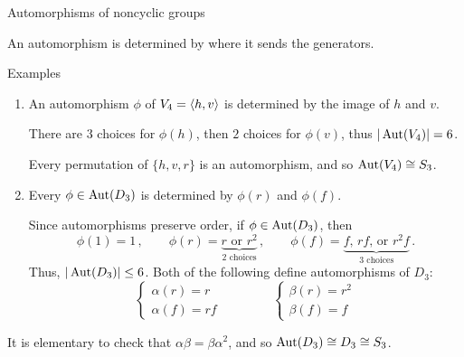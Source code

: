 \documentclass[8pt, handout]{beamer}
\newcommand{\Pause}{}      %
\begin{document}
\begin{frame}{Automorphisms of noncyclic groups}
    
  An automorphism is determined by where it sends the generators.
  
  \begin{exampleblock}{Examples} 
    \begin{enumerate}
    \item An automorphism $\phi$ of $V_4=\langle h,v\rangle$ is determined by the
      image of $h$ and $v$. \medskip\Pause
      
      There are $3$ choices for $\phi(h)$, then $2$ choices for
      $\phi(v)$, thus $|\operatorname{Aut}(V_4)|=6$. \medskip\Pause
      
      Every permutation of $\{h,v,r\}$ is an automorphism, and so
      $\operatorname{Aut}(V_4)\cong S_3$. \medskip\pause
      
    \item Every $\phi\in\operatorname{Aut}(D_3)$ is determined by $\phi(r)$ and
      $\phi(f)$. \medskip\Pause
      
      Since automorphisms preserve order, if $\phi\in\operatorname{Aut}(D_3)$, then 
      \[
      \phi(1)=1\,,\qquad \phi(r)=\underbrace{\text{$r$ or $r^2$}}_{\text{2
          choices}}\,,\qquad \phi(f)=\underbrace{\text{$f$, $rf$, or
          $r^2f$}}_{\text{3 choices}}\,.
      \]
      \Pause Thus, $|\operatorname{Aut}(D_3)|\leq 6$. \Pause Both of the following
      define automorphisms of $D_3$:
      \[
      \left\{\begin{array}{ll}
      \alpha(r)=r \\ \alpha(f)=rf
      \end{array}\right.\qquad\qquad
      \left\{\begin{array}{ll}
      \beta(r)=r^2 \\ \beta(f)=f
      \end{array}\right.
      \]
    \end{enumerate}
    
    It is elementary to check that $\alpha\beta=\beta\alpha^2$, and so
    $\operatorname{Aut}(D_3)\cong D_3\cong S_3$.
  \end{exampleblock}
  
\end{frame}

\end{document}
